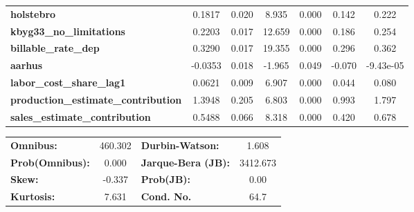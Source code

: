 \begin{center}
\begin{tabular}{lcccccc}
\textbf{holstebro}                          &       0.1817  &        0.020     &     8.935  &         0.000        &        0.142    &        0.222     \\
\textbf{kbyg33\_no\_limitations}            &       0.2203  &        0.017     &    12.659  &         0.000        &        0.186    &        0.254     \\
\textbf{billable\_rate\_dep}                &       0.3290  &        0.017     &    19.355  &         0.000        &        0.296    &        0.362     \\
\textbf{aarhus}                             &      -0.0353  &        0.018     &    -1.965  &         0.049        &       -0.070    &    -9.43e-05     \\
\textbf{labor\_cost\_share\_lag1}           &       0.0621  &        0.009     &     6.907  &         0.000        &        0.044    &        0.080     \\
\textbf{production\_estimate\_contribution} &       1.3948  &        0.205     &     6.803  &         0.000        &        0.993    &        1.797     \\
\textbf{sales\_estimate\_contribution}      &       0.5488  &        0.066     &     8.318  &         0.000        &        0.420    &        0.678     \\
\bottomrule
\end{tabular}
\begin{tabular}{lclc}
\textbf{Omnibus:}       & 460.302 & \textbf{  Durbin-Watson:     } &    1.608  \\
\textbf{Prob(Omnibus):} &   0.000 & \textbf{  Jarque-Bera (JB):  } & 3412.673  \\
\textbf{Skew:}          &  -0.337 & \textbf{  Prob(JB):          } &     0.00  \\
\textbf{Kurtosis:}      &   7.631 & \textbf{  Cond. No.          } &     64.7  \\
\bottomrule
\end{tabular}
\end{center}